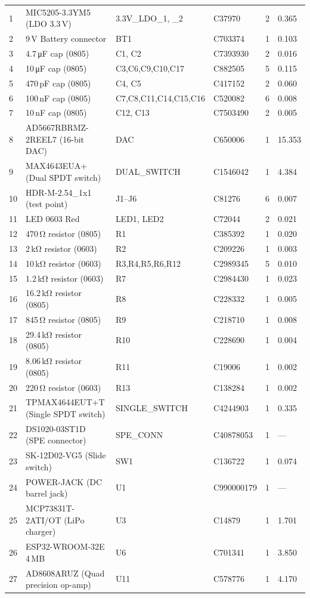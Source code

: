 \begin{longtable}{@{}p{0.4cm}p{3.2cm}p{1.8cm}p{2.6cm}p{1.0cm}p{1.0cm}@{}}
1  & MIC5205-3.3YM5 (LDO 3.3\,V) & 3.3V\_LDO\_1, \_2 & C37970 & 2 & 0.365 \\
2  & 9\,V Battery connector & BT1 & C703374 & 1 & 0.103 \\
3  & 4.7\,\si{\micro\farad} cap (0805) & C1, C2 & C7393930 & 2 & 0.016 \\
4  & 10\,\si{\micro\farad} cap (0805) & C3,C6,C9,C10,C17 & C882505 & 5 & 0.115 \\
5  & 470\,pF cap (0805) & C4, C5 & C417152 & 2 & 0.060 \\
6  & 100\,nF cap (0805) & C7,C8,C11,C14,C15,C16 & C520082 & 6 & 0.008 \\
7  & 10\,nF cap (0805) & C12, C13 & C7503490 & 2 & 0.005 \\
8  & AD5667RBRMZ-2REEL7 (16-bit DAC) & DAC & C650006 & 1 & 15.353 \\
9  & MAX4643EUA+ (Dual SPDT switch) & DUAL\_SWITCH & C1546042 & 1 & 4.384 \\
10 & HDR-M-2.54\_1x1 (test point) & J1--J6 & C81276 & 6 & 0.007 \\
11 & LED 0603 Red & LED1, LED2 & C72044 & 2 & 0.021 \\
12 & 470\,\si{\ohm} resistor (0805) & R1 & C385392 & 1 & 0.020 \\
13 & 2\,k\si{\ohm} resistor (0603) & R2 & C209226 & 1 & 0.003 \\
14 & 10\,k\si{\ohm} resistor (0603) & R3,R4,R5,R6,R12 & C2989345 & 5 & 0.010 \\
15 & 1.2\,k\si{\ohm} resistor (0603) & R7 & C2984430 & 1 & 0.023 \\
16 & 16.2\,k\si{\ohm} resistor (0805) & R8 & C228332 & 1 & 0.005 \\
17 & 845\,\si{\ohm} resistor (0805) & R9 & C218710 & 1 & 0.008 \\
18 & 29.4\,k\si{\ohm} resistor (0805) & R10 & C228690 & 1 & 0.004 \\
19 & 8.06\,k\si{\ohm} resistor (0805) & R11 & C19006 & 1 & 0.002 \\
20 & 220\,\si{\ohm} resistor (0603) & R13 & C138284 & 1 & 0.002 \\
21 & TPMAX4644EUT+T (Single SPDT switch) & SINGLE\_SWITCH & C4244903 & 1 & 0.335 \\
22 & DS1020-03ST1D (SPE connector) & SPE\_CONN & C40878053 & 1 & --- \\
23 & SK-12D02-VG5 (Slide switch) & SW1 & C136722 & 1 & 0.074 \\
24 & POWER-JACK (DC barrel jack) & U1 & C990000179 & 1 & --- \\
25 & MCP73831T-2ATI/OT (LiPo charger) & U3 & C14879 & 1 & 1.701 \\
26 & ESP32-WROOM-32E 4\,MB & U6 & C701341 & 1 & 3.850 \\
27 & AD8608ARUZ (Quad precision op-amp) & U11 & C578776 & 1 & 4.170 \\

\end{longtable}

